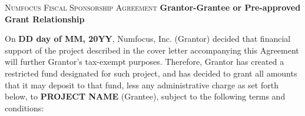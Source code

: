 \documentclass[english,letterpaper,12pt]{article}
\newcommand{\project}{\textbf{PROJECT NAME}}
\newcommand{\agreementdate}{\textbf{DD day of MM, 20YY}}
\begin{document}
\begin{center}
\textsc{\Large Numfocus Fiscal Sponsorship Agreement}\linebreak
\textbf{Grantor-Grantee or Pre-approved Grant Relationship}
\par\end{center}

\bigskip{}

On \agreementdate, Numfocus, Inc. (Grantor) decided that financial support of the project described in the cover letter accompanying this Agreement will further Grantor's tax-exempt purposes. Therefore, Grantor has created a restricted fund designated for such project, and has decided to grant all amounts that it may deposit to that fund, less any administrative charge as set forth below, to \project{} (Grantee), subject to the following terms and conditions: 
\end{document}
